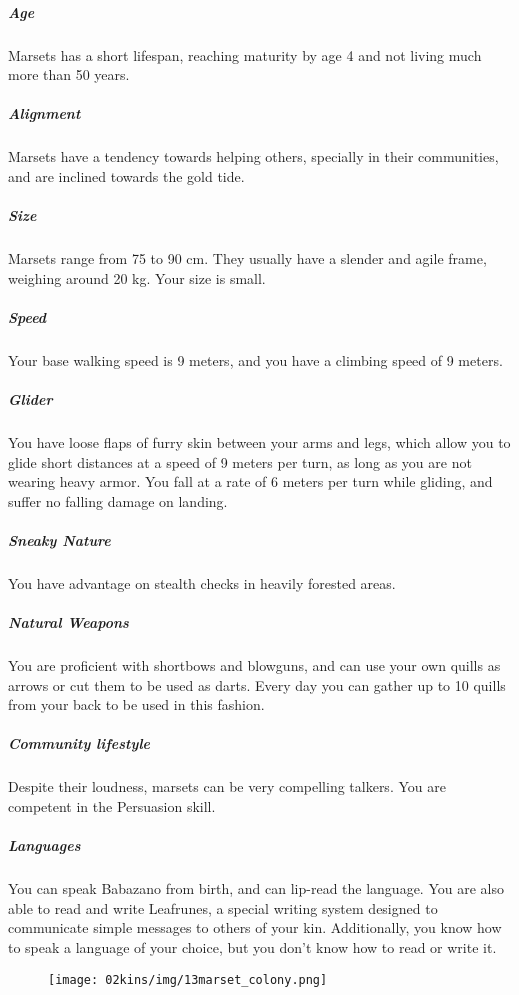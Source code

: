 \begin{linenumbers}
\subparagraph{Age} Marsets has a short lifespan, reaching maturity by age 4 and not living much more than 50 years.

\subparagraph{Alignment} Marsets have a tendency towards helping others, specially in their communities, and are inclined towards the gold tide.

\subparagraph{Size} Marsets range from 75 to 90 cm.
They usually have a slender and agile frame, weighing around 20 kg.
Your size is small.

\subparagraph{Speed} Your base walking speed is 9 meters, and you have a climbing speed of 9 meters.

\subparagraph{Glider} You have loose flaps of furry skin between your arms and legs, which allow you to glide short distances at a speed of 9 meters per turn, as long as you are not wearing heavy armor.
You fall at a rate of 6 meters per turn while gliding, and suffer no falling damage on landing.

\subparagraph{Sneaky Nature} You have advantage on stealth checks in heavily forested areas.

\subparagraph{Natural Weapons} You are proficient with shortbows and blowguns, and can use your own quills as arrows or cut them to be used as darts.
Every day you can gather up to 10 quills from your back to be used in this fashion.

\subparagraph{Community lifestyle} Despite their loudness, marsets can be very compelling talkers.
You are competent in the Persuasion skill.

\subparagraph{Languages} You can speak Babazano from birth, and can lip-read the language.
You are also able to read and write Leafrunes, a special writing system designed to communicate simple messages to others of your kin.
Additionally, you know how to speak a language of your choice, but you don't know how to read or write it.

\begin{figure}[!b]
    \centering
    \texttt{[image: 02kins/img/13marset\_colony.png]}
\end{figure}
\end{linenumbers}

\newpage
